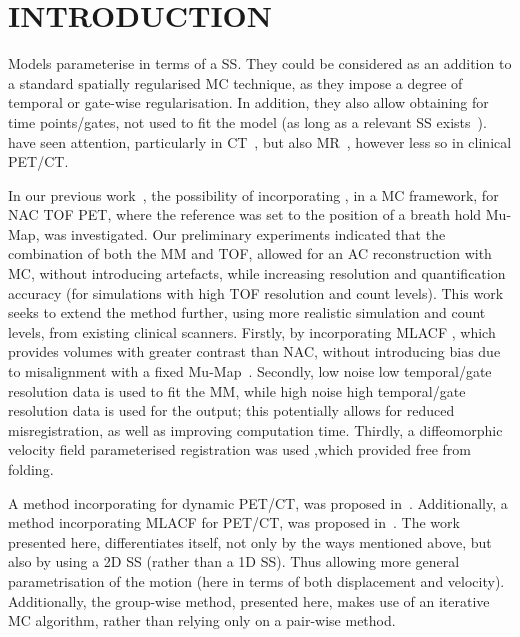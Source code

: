 \section{INTRODUCTION} \label{sec:introduction}
     Models parameterise  in terms of a \gls{SS}. They could be considered as an addition to a standard spatially regularised \gls{MC} technique, as they impose a degree of temporal or gate-wise regularisation. In addition, they also allow obtaining  for time points/gates, not used to fit the model (as long as a relevant \gls{SS} exists~\cite{McClelland2013}).  have seen attention, particularly in \acrshort{CT}~\cite{Li2007EnhancedModel}, but also \acrshort{MR}~\cite{Manke2002RespiratoryModels, Manber2016JointCorrection.}, however less so in clinical \acrshort{PET}/\acrshort{CT}.
    
    In our previous work~\cite{Whitehead2019ImpactPET, Whitehead2020PET/CTFields, Whitehead2021ComparisonMap}, the possibility of incorporating , in a \gls{MC} framework, for \gls{NAC} \gls{TOF} \acrshort{PET}, where the reference was set to the position of a breath hold \gls{Mu-Map}, was investigated. %
    Our preliminary experiments indicated that the combination of both the \gls{MM} and \gls{TOF}, allowed for an \gls{AC} reconstruction with \gls{MC}, without introducing artefacts, while increasing resolution and quantification accuracy (for simulations with high \gls{TOF} resolution and count levels). This work seeks to extend the method further, using more realistic simulation and count levels, from existing clinical scanners. Firstly, by incorporating \acrshort{MLACF} %
    , which provides volumes with greater contrast than \gls{NAC}, without introducing bias due to misalignment with a fixed \gls{Mu-Map}~\cite{Nuyts2012ML-reconstructionFactors}. Secondly, low noise low temporal/gate resolution data is used to fit the \gls{MM}, while high noise high temporal/gate resolution data is used for the output; this potentially allows for reduced misregistration, as well as improving computation time. Thirdly, a diffeomorphic velocity field parameterised registration was used ,which provided  free from folding.
    
    A method incorporating  for dynamic \acrshort{PET}/\acrshort{CT}, was proposed in~\cite{Chan2018Non-RigidPET}. Additionally, a method incorporating \acrshort{MLACF} for \acrshort{PET}/\acrshort{CT}, was proposed in~\cite{Lu2018RespiratoryData}. The work presented here, differentiates itself, not only by the ways mentioned above, but also by using a \acrshort{2D} \gls{SS} (rather than a \acrshort{1D} \gls{SS}). Thus allowing more general parametrisation of the motion (here in terms of both displacement and velocity). Additionally, the group-wise method, presented here, makes use of an iterative \gls{MC} algorithm, rather than relying only on a pair-wise method.


